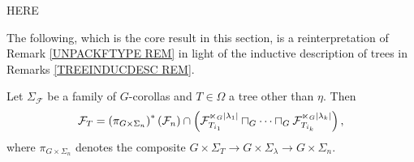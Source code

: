 \documentclass[a4paper,10pt]{article}%
\begin{document}
{\color{red} HERE}

The following, which is the core result in this section, is a reinterpretation of 
Remark \ref{UNPACKFTYPE REM}
in light of the inductive description of trees in
Remarks \ref{TREEINDUCDESC REM}.


\begin{lemma}\label{KEYLEMMAGECO LEM}
  Let $\Sigma_\mathcal{F}$ be a family of $G$-corollas and 
  $T \in \Omega$ a tree other than $\eta$. Then
  \begin{equation}\label{KEYLEMMAGECO EQ}
    \mathcal{F}_T =
    \left(\pi_{G \times \Sigma_n}\right)^{\**}(\mathcal{F}_n)
    \cap
    \left(
      \mathcal{F}_{T_{i_1}}^{\ltimes_G |\lambda_1|}
      \sqcap_G \cdots \sqcap_G
      \mathcal{F}_{T_{i_k}}^{\ltimes_G |\lambda_k|}
    \right),
  \end{equation}
  where $\pi_{G \times \Sigma_n}$ denotes the composite
  $G \times \Sigma_T \to G \times \Sigma_{\lambda} \to
  G \times \Sigma_n$.
\end{lemma}
\end{document}
